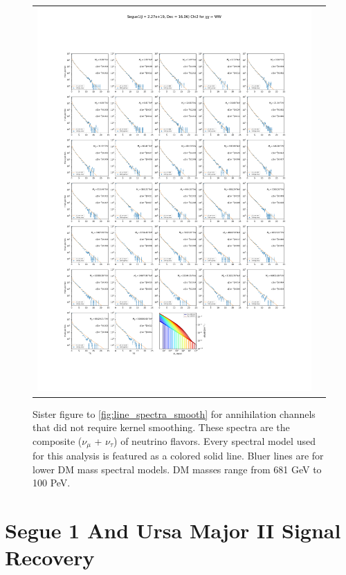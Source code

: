 \begin{figure}[ht]
{\begin{tabular}{cc}
            \includegraphics[clip, trim=22.1cm 6.5cm 19.5cm 56.5cm, scale=0.6]{figures/ic_DM/dm_plots/Segue1_WW_chi2_Masspanel_2024-03-23.pdf} \\
        \end{tabular}
    }\caption{Sister figure to \cref{fig:line_spectra_smooth} for annihilation channels that did not require kernel smoothing. These spectra are the composite ($\nu_\mu$ + $\nu_\tau$) of neutrino flavors. Every spectral model used for this analysis is featured as a colored solid line. Bluer lines are for lower DM mass spectral models. DM masses range from 681 GeV to 100 PeV.}
    \label{fig:compsoite_nu_spec}
\end{figure}

\clearpage

\section{Segue 1 And Ursa Major II Signal Recovery} \label{sec:apdx_TS_per_src}

